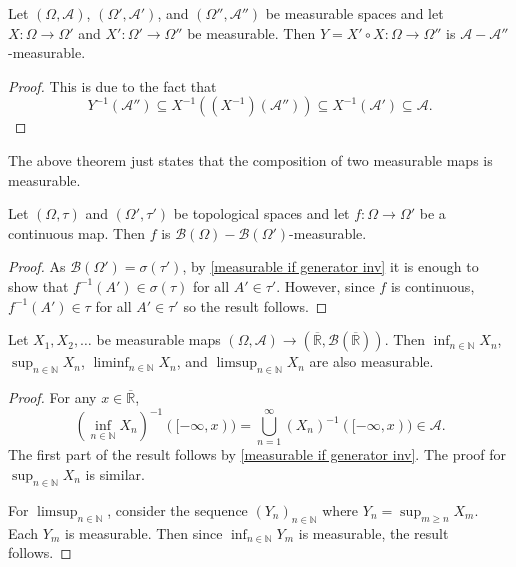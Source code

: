 \begin{theorem}
        Let $(\Omega,\mathcal{A})$, $(\Omega',\mathcal{A}')$, and $(\Omega'',\mathcal{A}'')$ be measurable spaces and let $X:\Omega\to\Omega'$ and $X':\Omega'\to\Omega''$ be measurable. Then $Y=X'\circ X:\Omega\to\Omega''$ is $\mathcal{A}-\mathcal{A}''$-measurable.
\end{theorem}
\begin{proof}
    This is due to the fact that
    $$Y^{-1}(\mathcal{A}'')\subseteq X^{-1}((X^{-1})(\mathcal{A}''))\subseteq X^{-1}(\mathcal{A}')\subseteq \mathcal{A}.$$
\end{proof}

The above theorem just states that the composition of two measurable maps is measurable.

\begin{theorem}
    Let $(\Omega,\tau)$ and $(\Omega',\tau')$ be topological spaces and let $f:\Omega\to\Omega'$ be a continuous map. Then $f$ is $\mathcal{B}(\Omega)-\mathcal{B}(\Omega')$-measurable.
\end{theorem}
\begin{proof}
    As $\mathcal{B}(\Omega')=\sigma(\tau')$, by \cref{measurable if generator inv} it is enough to show that $f^{-1}(A')\in\sigma(\tau)$ for all $A'\in\tau'$. However, since $f$ is continuous, $f^{-1}(A')\in\tau$ for all $A'\in\tau'$ so the result follows.
\end{proof}

\begin{theorem}
    Let $X_1,X_2,\ldots$ be measurable maps $(\Omega,\mathcal{A})\to(\overline{\mathbb{R}}, \mathcal{B}(\overline{\mathbb{R}}))$. Then $\inf_{n\in\mathbb{N}}X_n$, $\sup_{n\in\mathbb{N}}X_n$, $\liminf_{n\in\mathbb{N}}X_n$, and $\limsup_{n\in\mathbb{N}}X_n$ are also measurable.
\end{theorem}
\begin{proof}
    For any $x\in\overline{\mathbb{R}}$,
    $$\left(\inf_{n\in\mathbb{N}}X_n\right)^{-1}([-\infty,x))=\bigcup_{n=1}^\infty (X_n)^{-1}([-\infty,x))\in\mathcal{A}.$$
    The first part of the result follows by \cref{measurable if generator inv}. The proof for $\sup_{n\in\mathbb{N}}X_n$ is similar.
    
    For $\limsup_{n\in\mathbb{N}}$, consider the sequence $(Y_n)_{n\in\mathbb{N}}$ where $Y_n=\sup_{m\geq n}X_m$. Each $Y_m$ is measurable. Then since $\inf_{n\in\mathbb{N}}Y_m$ is measurable, the result follows.
\end{proof}

